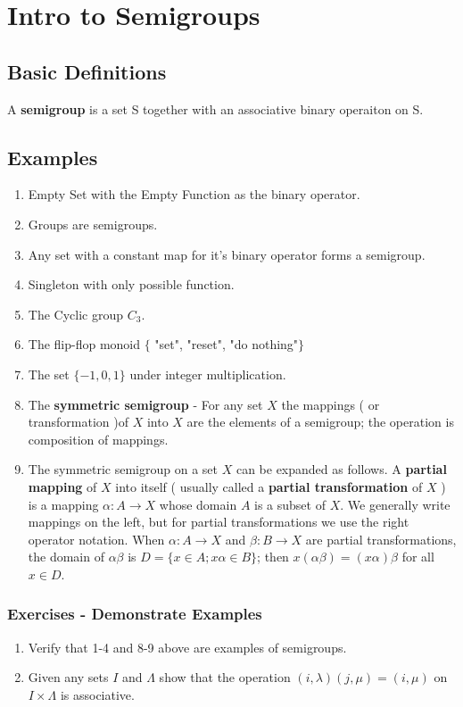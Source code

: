 \documentclass{article}
\begin{document}
\section{Intro to Semigroups}
\subsection{Basic Definitions}
A \textbf{semigroup} is a set S together with an associative binary operaiton on S.



\subsection{Examples}
\begin{enumerate}
	\item Empty Set with the Empty Function as the binary operator.
	\item Groups are semigroups.
	\item Any set with a constant map for it's binary operator forms a semigroup.
	\item Singleton with only possible function.
	
	\item The Cyclic group $C_3$.
	\item The flip-flop monoid $\{$ "set", "reset", "do nothing"$\}$
	\item The set $\{-1, 0, 1\}$ under integer multiplication.
	\item The \textbf{symmetric semigroup} - For any set $X$ the mappings ( or transformation )of $X$ into $X$ are the elements of a semigroup; the operation is composition of mappings.
	\item The symmetric semigroup on a set $X$ can be expanded as follows. A \textbf{partial mapping} of $X$ into itself ( usually called a \textbf{partial transformation} of $X$ ) is a mapping $\alpha : A \to X$ whose domain $A$ is a subset of $X$. We generally write mappings on the left, but for partial transformations we use the right operator notation. When $\alpha : A \to X$ and $\beta : B \to X$ are partial transformations, the domain of $\alpha \beta $ is $ D = \{ x\in A; x\alpha \in B \}$; then $x ( \alpha \beta ) = (x \alpha ) \beta$ for all $x \in D$.
\end{enumerate}

\subsubsection{Exercises - Demonstrate Examples}
\begin{enumerate}
	\item Verify that 1-4 and 8-9 above are examples of semigroups.
	\item Given any sets $I$ and $\Lambda$ show that the operation $(i, \lambda)(j,\mu) = (i,\mu)$ on $I \times \Lambda$ is associative.
\end{enumerate}
\end{document}
